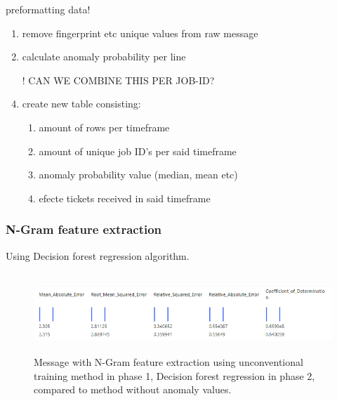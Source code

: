 preformatting data! \\
\begin{enumerate}
    \item remove fingerprint etc unique values from raw message
    \item calculate anomaly probability per line
    \item [!] CAN WE COMBINE THIS PER JOB-ID?
    \item create new table consisting:
    \begin{enumerate}
        \item amount of rows per timeframe
        \item amount of unique job ID's per said timeframe
        \item anomaly probability value (median, mean etc)
        \item efecte tickets received in said timeframe
    \end{enumerate}
\end{enumerate}









\clearpage


\subsubsection*{N-Gram feature extraction}
Using Decision forest regression algorithm.
\\
\begin{figure}[htb]
    \centering
    \includegraphics[height=30mm,scale=0.5]{./appendices/msg_ngram_decision-forest-reg_lewd2unanom.png}
    \caption{Message with N-Gram feature extraction
    using unconventional training method in phase 1,
        Decision forest regression in phase 2,
        compared to method without anomaly values.
        \label{fig:msg_ngram_decision-forest-reg_lewd2unanom}}
\end{figure}

